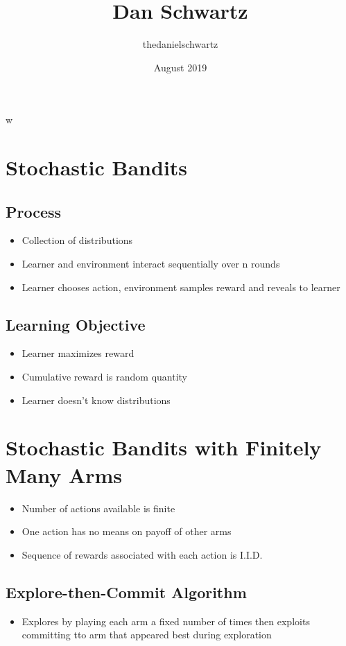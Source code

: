 w\documentclass{article}
\title{Dan Schwartz}
\author{thedanielschwartz }
\date{August 2019}
\begin{document}
\maketitle

\section{Stochastic Bandits}
\subsection{Process}
\begin{itemize}
	\item Collection of distributions
	\item Learner and environment interact sequentially over n rounds
	\item Learner chooses action, environment samples reward and reveals to learner
\end{itemize}
\subsection{Learning Objective}
\begin{itemize}
	\item Learner maximizes reward
	\item Cumulative reward is random quantity
	\item Learner doesn't know distributions
\end{itemize}

\section{Stochastic Bandits with Finitely Many Arms}
\begin{itemize}
	\item Number of actions available is finite
	\item One action has no means on payoff of other arms
	\item Sequence of rewards associated with each action is I.I.D.
\end{itemize}
\subsection{Explore-then-Commit Algorithm}
\begin{itemize}
	\item Explores by playing each arm a fixed number of times then exploits committing tto arm that appeared best during exploration
\end{itemize}
\end{document}
